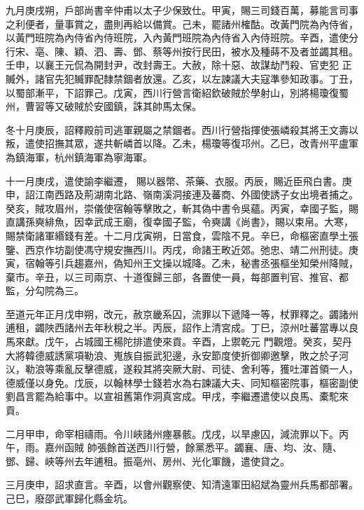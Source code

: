 \begin{pinyinscope}
 九月庚戌朔，戶部尚書辛仲甫以太子少保致仕。甲寅，賜三司錢百萬，募能言司事之利便者，量事賞之，盡則再給以備賞。己未，罷諸州榷酤。改黃門院為內侍省，以黃門班院為內侍省內侍班院，入內黃門班院為內侍省入內侍班院。辛酉，遣使分行宋、亳、陳、穎、泗、壽、鄧、蔡等州按行民田，被水及種蒔不及者並蠲其租。壬申，以襄王元侃為開封尹，改封壽王。大赦，除十惡、故謀劫鬥殺、官吏犯
 正贓外，諸官先犯贓罪配隸禁錮者放還。乙亥，以左諫議大夫寇準參知政事。丁丑，以蜀部漸平，下詔罪己。戊寅，西川行營言衛紹欽破賊於學射山，別將楊瓊復蜀州，曹習等又破賊於安國鎮，誅其帥馬太保。



 冬十月庚辰，詔釋殿前司逃軍親屬之禁錮者。西川行營指揮使張嶙殺其將王文壽以叛，遣使招撫其眾，遂共斬嶙首以降。乙未，楊瓊等復邛州。乙巳，改青州平盧軍為鎮海軍，杭州鎮海軍為寧海軍。



 十一月庚戌，遣使諭李繼遷，
 賜以器幣、茶藥、衣服。丙辰，賜近臣飛白書。庚申，詔江南西路及荊湖南北路、嶺南溪洞接連及蕃商、外國使誘子女出境者捕之。癸亥，賊攻眉州，崇儀使宿翰等擊敗之，斬其偽中書令吳蘊。丙寅，幸國子監，賜直講孫奭緋魚，因幸武成王廟，復幸國子監，令奭講《尚書》，賜以束帛。大寒，賜禁衛諸軍緡錢有差。十二月戊寅朔，日當食，雲陰不見。辛巳，命樞密直學土張鑒、西京作坊副使馮守規安撫西川。丙戌，命諸王畋近郊。弛忠、靖二州刑徒。庚
 寅，宿翰等引兵趨嘉州，偽知州王文操以城降。乙未，秘書丞張樞坐知榮州降賊，棄市。辛丑，以三司兩京、十道復歸三部，各置使一員，每部置判官、推官、都監，分勾院為三。



 至道元年正月戊申朔，改元，赦京畿系囚，流罪以下遞降一等，杖罪釋之。蠲諸州逋租，蠲陜西諸州去年秋稅之半。丙辰，詔作上清宮成。丁巳，涼州吐蕃當專以良馬來獻。戊午，占城國王楊陀排遣使來貢。辛酉，上禦乾元
 門觀燈。癸亥，契丹大將韓德威誘黨項勒浪、嵬族自振武犯邊，永安節度使折御卿邀擊，敗之於子河㲼，勒浪等乘亂反擊德威，遂殺其將突厥大尉、司徒、舍利等，獲吐渾首領一人，德威僅以身免。戊辰，以翰林學士錢若水為右諫議大夫、同知樞密院事，樞密副使劉昌言罷為給事中。以宣祖舊第作洞真宮成。甲戌，李繼遷遣使以良馬、橐駝來貢。



 二月甲申，命宰相禱雨。令川峽諸州瘞暴骸。戊戌，以旱慮囚，減流罪以下。丙午，雨。嘉州函賊
 帥張餘首送西川行營，餘黨悉平。蠲襄、唐、均、汝、隨、鄧、歸、峽等州去年逋租。振亳州、房州、光化軍饑，遣使貸之。



 三月庚申，詔求直言。辛酉，以會州觀察使、知清遠軍田紹斌為靈州兵馬都部署。己巳，廢邵武軍歸化縣金坑。




\end{pinyinscope}
